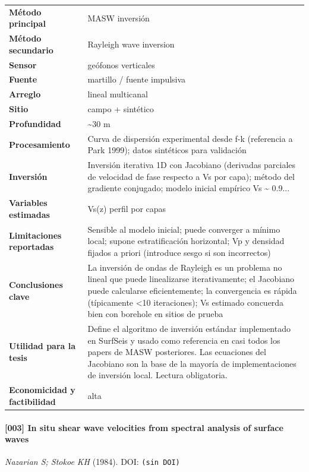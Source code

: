\begin{center}\scriptsize
\begin{tabularx}{\textwidth}{@{}>{\bfseries}p{3.3cm} X@{}}
\toprule
M\'etodo principal & MASW inversión \\
M\'etodo secundario & Rayleigh wave inversion \\
Sensor & geófonos verticales \\
Fuente & martillo / fuente impulsiva \\
Arreglo & lineal multicanal \\
Sitio & campo + sintético \\
Profundidad & \textasciitilde{}30 m \\
Procesamiento & Curva de dispersión experimental desde f-k (referencia a Park 1999); datos sintéticos para validación \\
Inversi\'on & Inversión iterativa 1D con Jacobiano (derivadas parciales de velocidad de fase respecto a Vs por capa); método del gradiente conjugado; modelo inicial empírico Vs \textasciitilde{} 0.9... \\
Variables estimadas & Vs(z) perfil por capas \\
Limitaciones reportadas & Sensible al modelo inicial; puede converger a mínimo local; supone estratificación horizontal; Vp y densidad fijados a priori (introduce sesgo si son incorrectos) \\
Conclusiones clave & La inversión de ondas de Rayleigh es un problema no lineal que puede linealizarse iterativamente; el Jacobiano puede calcularse eficientemente; la convergencia es rápida (típicamente <10 iteraciones); Vs estimado concuerda bien con borehole en sitios de prueba \\
Utilidad para la tesis & Define el algoritmo de inversión estándar implementado en SurfSeis y usado como referencia en casi todos los papers de MASW posteriores. Las ecuaciones del Jacobiano son la base de la mayoría de implementaciones de inversión local. Lectura obligatoria. \\
Economicidad y factibilidad & alta \\
\bottomrule
\end{tabularx}
\end{center}

\paragraph{[003] In situ shear wave velocities from spectral analysis of surface waves} \emph{Nazarian S; Stokoe KH} (1984).
{\scriptsize DOI: \texttt{(sin DOI)}}

